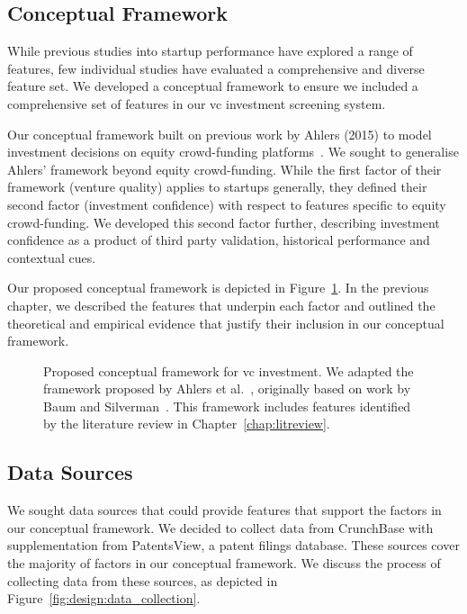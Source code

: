 \documentclass[../thesis/thesis.tex]{subfiles}
\begin{document}
\subsection{Conceptual Framework}

While previous studies into startup performance have explored a range of features, few individual studies have evaluated a comprehensive and diverse feature set. We developed a conceptual framework to ensure we included a comprehensive set of features in our \gls{vc} investment screening system.

Our conceptual framework built on previous work by Ahlers (2015) to model investment decisions on equity crowd-funding platforms~\cite{ahlers2015}. We sought to generalise Ahlers' framework beyond equity crowd-funding. While the first factor of their framework (venture quality) applies to startups generally, they defined their second factor (investment confidence) with respect to features specific to equity crowd-funding. We developed this second factor further, describing investment confidence as a product of third party validation, historical performance and contextual cues.

Our proposed conceptual framework is depicted in Figure~\ref{fig:design:features:framework_details}. In the previous chapter, we described the features that underpin each factor and outlined the theoretical and empirical evidence that justify their inclusion in our conceptual framework.

\begin{figure}[!htb]
    \centering
    
    \caption[Conceptual framework for \gls{vc} investment.]{Proposed conceptual framework for \gls{vc} investment. We adapted the framework proposed by Ahlers et al.~\cite{ahlers2015}, originally based on work by Baum and Silverman~\cite{baum2004}. This framework includes features identified by the literature review in Chapter~\ref{chap:litreview}.}
    \label{fig:design:features:framework_details}
\end{figure}

\subsection{Data Sources}

We sought data sources that could provide features that support the factors in our conceptual framework. We decided to collect data from CrunchBase with supplementation from PatentsView, a patent filings database. These sources cover the majority of factors in our conceptual framework. We discuss the process of collecting data from these sources, as depicted in Figure~\ref{fig:design:data_collection}.
\end{document}
